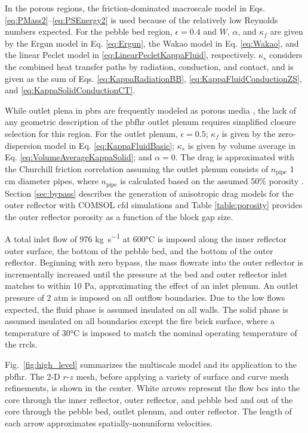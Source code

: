 In the porous regions, the friction-dominated macroscale model in Eqs. \eqref{eq:PMass2}--\eqref{eq:PSEnergy2} is used because of the relatively low Reynolds numbers expected. For the pebble bed region, \(\epsilon=0.4\) and \(W\), \(\alpha\), and \(\kappa_f\) are given by the Ergun model in Eq. \eqref{eq:Ergun}, the Wakao model in Eq. \eqref{eq:Wakao}, and the linear Peclet model in \eqref{eq:LinearPecletKappaFluid}, respectively. \(\kappa_s\) considers the combined heat transfer paths by radiation, conduction, and contact, and is given as the sum of Eqs. \eqref{eq:KappaRadiationBB}, \eqref{eq:KappaFluidConductionZS}, and \eqref{eq:KappaSolidConductionCT}. 

While outlet plena in \glspl{pbr} are frequently modeled as porous media \cite{ximing}, the lack of any geometric description of the \gls{pbfhr} outlet plenum requires simplified closure selection for this region. For the outlet plenum, \(\epsilon=0.5\); \(\kappa_f\) is given by the zero-dispersion model in Eq. \eqref{eq:KappaFluidBasic}; \(\kappa_s\) is given by volume average in Eq. \eqref{eq:VolumeAverageKappaSolid}; and \(\alpha=0\). The drag is approximated with the Churchill friction correlation assuming the outlet plenum consists of \(n_\text{pipe}\) 1 \si{\centi\meter} diameter pipes, where \(n_\text{pipe}\) is calculated based on the assumed 50\% porosity \cite{churchill}. Section \ref{sec:bypass} describes the generation of anisotropic drag models for the outer reflector with COMSOL \gls{cfd} simulations and Table \ref{table:porosity} provides the outer reflector porosity as a function of the block gap size. 

A total inlet flow of 976 \si{\kilo\gram\per\second} at 600\si{\celsius} is imposed along the inner reflector outer surface, the bottom of the pebble bed, and the bottom of the outer reflector. Beginning with zero bypass, the mass flowrate into the outer reflector is incrementally increased until the pressure at the bed and outer reflector inlet matches to within 10 \si{\pascal}, approximating the effect of an inlet plenum. An outlet pressure of 2 atm is imposed on all outflow boundaries. Due to the low flows expected, the fluid phase is assumed insulated on all walls. The solid phase is assumed insulated on all boundaries except the fire brick surface, where a temperature of 30\si{\celsius} is imposed to match the nominal operating temperature of the \gls{rrcls}. 

Fig.\ \ref{fig:high_level} summarizes the multiscale model and its application to the \gls{pbfhr}. The 2-D $r$-$z$ mesh, before applying a variety of surface and curve mesh refinements, is shown in the center. White arrows represent the flow \glspl{bc} into the core through the inner reflector, outer reflector, and pebble bed and out of the core through the pebble bed, outlet plenum, and outer reflector. The length of each arrow approximates spatially-nonuniform velocities.

